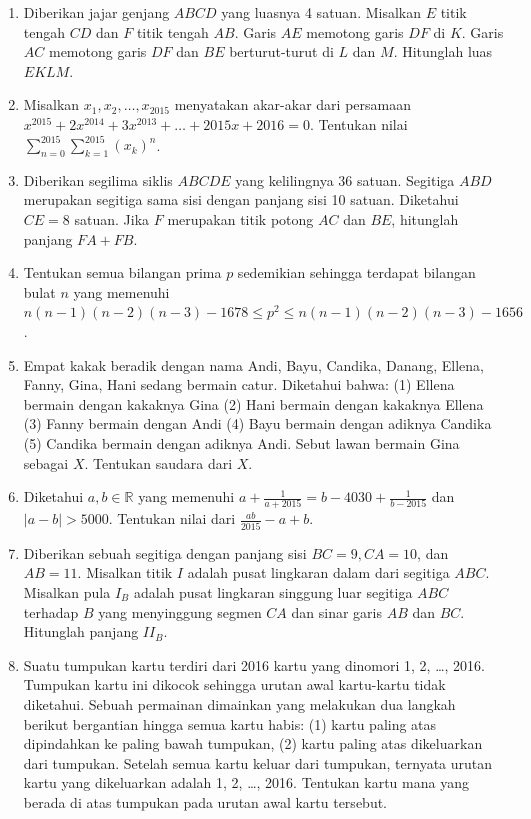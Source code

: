\documentclass[11pt]{article}
\begin{document}
\begin{enumerate}
    \item Diberikan jajar genjang $ABCD$ yang luasnya 4 satuan. Misalkan $E$ titik tengah $CD$ dan $F$ titik tengah $AB$. Garis $AE$ memotong garis $DF$ di $K$. Garis $AC$ memotong garis $DF$ dan $BE$ berturut-turut di $L$ dan $M$. Hitunglah luas $EKLM$.
    
    \item Misalkan $x_1, x_2, \dots, x_{2015}$ menyatakan akar-akar dari persamaan $x^{2015} + 2x^{2014} + 3x^{2013} + \dots + 2015x + 2016 = 0$. Tentukan nilai $\sum_{n=0}^{2015} \sum_{k=1}^{2015} (x_k)^n$.
    
    \item Diberikan segilima siklis $ABCDE$ yang kelilingnya 36 satuan. Segitiga $ABD$ merupakan segitiga sama sisi dengan panjang sisi 10 satuan. Diketahui $CE = 8$ satuan. Jika $F$ merupakan titik potong $AC$ dan $BE$, hitunglah panjang $FA + FB$.
    
    \item Tentukan semua bilangan prima $p$ sedemikian sehingga terdapat bilangan bulat $n$ yang memenuhi $n(n - 1)(n - 2)(n - 3) - 1678 \le p^2 \le n(n - 1)(n - 2)(n - 3) - 1656$.
    
    \item Empat kakak beradik dengan nama Andi, Bayu, Candika, Danang, Ellena, Fanny, Gina, Hani sedang bermain catur. Diketahui bahwa: (1) Ellena bermain dengan kakaknya Gina (2) Hani bermain dengan kakaknya Ellena (3) Fanny bermain dengan Andi (4) Bayu bermain dengan adiknya Candika (5) Candika bermain dengan adiknya Andi. Sebut lawan bermain Gina sebagai $X$. Tentukan saudara dari $X$.
    
    \item Diketahui $a, b \in \mathbb{R}$ yang memenuhi $a + \frac{1}{a + 2015} = b - 4030 + \frac{1}{b - 2015}$ dan $|a - b| > 5000$. Tentukan nilai dari $\frac{ab}{2015} - a + b$.
    
    \item Diberikan sebuah segitiga dengan panjang sisi $BC = 9, CA = 10$, dan $AB = 11$. Misalkan titik $I$ adalah pusat lingkaran dalam dari segitiga $ABC$. Misalkan pula $I_B$ adalah pusat lingkaran singgung luar segitiga $ABC$ terhadap $B$ yang menyinggung segmen $CA$ dan sinar garis $AB$ dan $BC$. Hitunglah panjang $II_B$.
    
    \item Suatu tumpukan kartu terdiri dari 2016 kartu yang dinomori 1, 2, \dots, 2016. Tumpukan kartu ini dikocok sehingga urutan awal kartu-kartu tidak diketahui. Sebuah permainan dimainkan yang melakukan dua langkah berikut bergantian hingga semua kartu habis: (1) kartu paling atas dipindahkan ke paling bawah tumpukan, (2) kartu paling atas dikeluarkan dari tumpukan. Setelah semua kartu keluar dari tumpukan, ternyata urutan kartu yang dikeluarkan adalah 1, 2, \dots, 2016. Tentukan kartu mana yang berada di atas tumpukan pada urutan awal kartu tersebut.
    

\end{enumerate}
\end{document}
